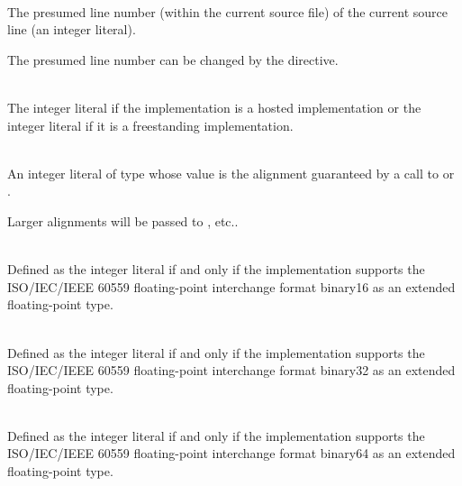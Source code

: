 \begin{description}
\item
{}%
\\
The presumed line number (within the current source file) of the current source line
(an integer literal).
\begin{footnote}
The presumed line number can be changed by the  directive.
\end{footnote}

\item
{}%
%
%
\\
The integer literal 
if the implementation is a hosted implementation or
the integer literal 
if it is a freestanding implementation.

\item
{}%
\\
An integer literal of type 
whose value is the alignment guaranteed
by a call to 
or .
\begin{note}
Larger alignments will be passed to
, etc..
\end{note}

\item
{}%
\\
Defined as the integer literal 
if and only if the implementation supports
the ISO/IEC/IEEE 60559 floating-point interchange format binary16
as an extended floating-point type.

\item
{}%
\\
Defined as the integer literal 
if and only if the implementation supports
the ISO/IEC/IEEE 60559 floating-point interchange format binary32
as an extended floating-point type.

\item
{}%
\\
Defined as the integer literal 
if and only if the implementation supports
the ISO/IEC/IEEE 60559 floating-point interchange format binary64
as an extended floating-point type.


\end{description}
